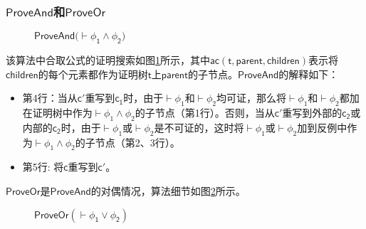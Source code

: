 \subsubsection{$\mathsf{ProveAnd}$和$\mathsf{ProveOr}$}
\begin{figure}[h!]\footnotesize
	\centering
	\noindent{}
	\caption{$\mathsf{ProveAnd (\vdash\phi_1\wedge\phi_2})$}
	\label{algorithm:and}
\end{figure}
该算法中合取公式的证明搜索如图\ref{algorithm:and}所示，其中$\mathsf{ac (t, parent, children)}$表示将$\mathsf{children}$的每个元素都作为证明树$\mathsf{t}$上$\mathsf{parent}$的子节点。$\mathsf{ProveAnd}$的解释如下：

\begin{itemize}
	\item 第4行：当从$\mathsf{c'}$重写到$\mathsf{c_1}$时，由于$\vdash\phi_1$和$\vdash\phi_2$均可证，那么将$\vdash\phi_1$和$\vdash\phi_2$都加在证明树中作为$\vdash\phi_1\wedge\phi_2$的子节点（第1行）。否则，当从$\mathsf{c'}$重写到外部的$\mathsf{c_2}$或内部的$\mathsf{c_2}$时，由于$\vdash\phi_1$或$\vdash\phi_2$是不可证的，这时将$\vdash\phi_1$或$\vdash\phi_2$加到反例中作为$\vdash\phi_1\wedge\phi_2$的子节点（第2、3行）。
	\item 第5行: 将$\mathsf{c}$重写到$\mathsf{c'}$。
\end{itemize}


$\mathsf{ProveOr}$是$\mathsf{ProveAnd}$的对偶情况，算法细节如图\ref{algorithm:or}所示。
\begin{figure}[h!]\footnotesize
	\centering
	\noindent{}
	\caption{$\mathsf{ProveOr (\vdash\phi_1\vee\phi_2)}$}
	\label{algorithm:or}
\end{figure}



